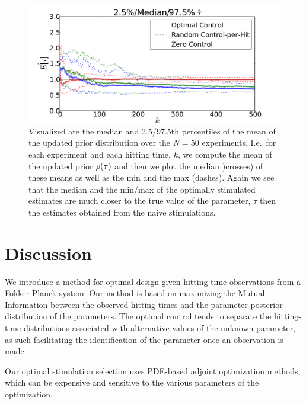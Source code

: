 \begin{figure}[htp]
\begin{center}
  \includegraphics[width=\textwidth]{Figs/HTOnlineEstimator/online_updated_prior_quantiles_mean_per_experiment.pdf}
  \caption[Quantiles of the Mean Estimates]{Visualized are the median and
  2.5/97.5th percentiles of the mean of the updated prior
  distribution over the $N=50$ experiments. I.e.\ for each experiment and each
  hitting time, $k$, we compute the mean of the updated prior $\rho({ \tau })$ and then we plot the median
  )crosses) of these means as well as the min and the max (dashes). Again we see
  that the median and the min/max of the optimally stimulated estimates are much closer to the
  true value of the parameter, $\tau$ then the estimates obtained from the
  naive stimulations.}
  \label{fig:online_optimization_quantiles_belief_evolution}
\end{center}
\end{figure}

\section{Discussion}
\label{sec:discussion}
We introduce a method for optimal design given hitting-time observations from a
Fokker-Planck system. Our method is based on maximizing the Mutual Information
between the observed hitting times and the parameter posterior distribution
of the parameters. The optimal control tends to separate
the hitting-time distributions associated with alternative values of the unknown
parameter, as such facilitating the identification of the parameter once an
observation is made. 

Our optimal stimulation selection uses PDE-based adjoint
optimization methods, which can be expensive and sensitive to the various
parameters of the optimization. 

